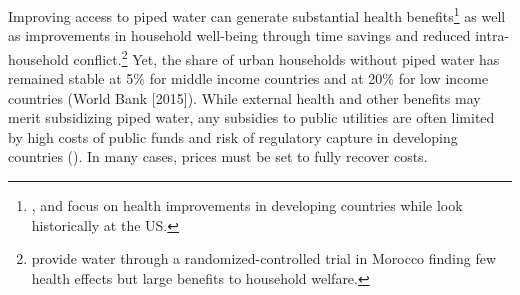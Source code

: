 \documentclass[12pt]{article}
\begin{document}
Improving access to piped water can generate substantial health benefits\footnote{\cite{zhang2016long,kosec2014child,gamper2010impact}, and \cite{galiani2005water} focus on health improvements in developing countries while \cite{cutler2005role} look historically at the US.} as well as improvements in household well-being through time savings and reduced intra-household conflict.\footnote{\cite{devoto2012happiness} provide water through a randomized-controlled trial in Morocco finding few health effects but large benefits to household welfare.}  Yet, the share of urban households without piped water has remained stable at 5\% for middle income countries and at 20\% for low income countries (World Bank [2015]).  While external health and other benefits may merit subsidizing piped water, any subsidies to public utilities are often limited by high costs of public funds and risk of regulatory capture in developing countries (\cite{laffont2005regulation}).  In many cases, prices must be set to fully recover costs.


\end{document}
